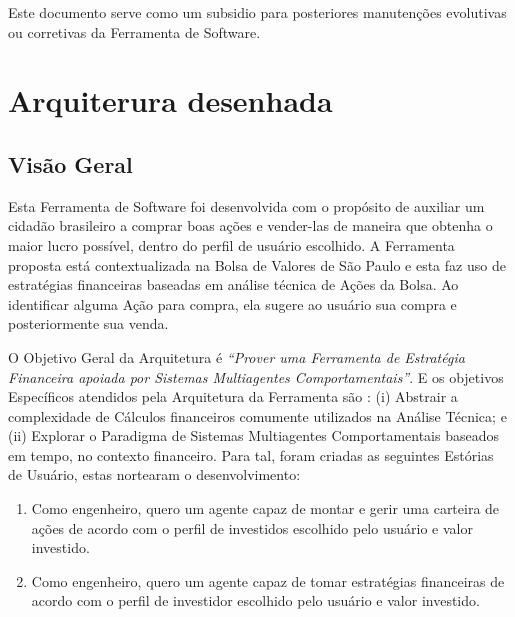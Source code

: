 \begin{apendicesenv}
Este documento serve como um subsidio para posteriores manutenções evolutivas ou corretivas da Ferramenta de Software.



\section{Arquiterura desenhada}
\subsection{Visão Geral}

Esta Ferramenta de Software foi desenvolvida com o propósito de auxiliar um cidadão brasileiro a comprar boas ações e vender-las de maneira que obtenha o maior lucro possível, dentro do perfil de usuário escolhido. A Ferramenta proposta está contextualizada na Bolsa de Valores de São Paulo e esta faz uso de estratégias financeiras baseadas em análise técnica de Ações da Bolsa. Ao identificar alguma Ação para compra, ela sugere ao usuário sua compra e posteriormente sua venda. 

O Objetivo Geral da Arquitetura é \textit{“Prover uma Ferramenta de Estratégia Financeira apoiada por Sistemas Multiagentes Comportamentais”}. E os objetivos Específicos atendidos pela Arquitetura da Ferramenta são : (i) Abstrair a complexidade de Cálculos financeiros comumente utilizados na Análise Técnica; e (ii) Explorar o Paradigma de Sistemas Multiagentes Comportamentais baseados em tempo, no contexto financeiro. Para tal, foram criadas as seguintes Estórias de Usuário, estas nortearam o desenvolvimento:

\begin{enumerate}

	\item Como engenheiro, quero um agente capaz de montar e gerir uma carteira de ações de acordo com o perfil de investidos escolhido pelo usuário e valor investido. 
	\item Como engenheiro, quero um agente capaz de tomar estratégias financeiras de acordo com o perfil de investidor escolhido pelo usuário e valor investido.
\end{enumerate}


\end{apendicesenv}
